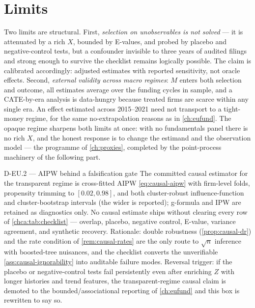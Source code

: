 \section{Limits}\label{chca:sec:limits}

Two limits are structural. First, \emph{selection on unobservables is not solved} --- it is
attenuated by a rich $X$, bounded by E-values, and probed by placebo and negative-control
tests, but a confounder invisible to three years of audited filings and strong enough to
survive the checklist remains logically possible. The claim is calibrated accordingly: adjusted
estimates with reported sensitivity, not oracle effects. Second, \emph{external validity across
macro regimes}: $M$ enters both selection and outcome, all estimates average over the funding
cycles in sample, and a CATE-by-era analysis is data-hungry because treated firms are scarce
within any single era. An effect estimated across 2015--2021 need not
transport to a tight-money regime, for the same no-extrapolation reasons as in \cref{ch:eufund}.
The opaque regime sharpens both limits at once: with no fundamentals panel there is no rich $X$,
and the honest response is to change the estimand and the observation model --- the programme of
\cref{ch:proxies}, completed by the point-process machinery of the following part.

\begin{decision}{D-EU.2 --- AIPW behind a falsification gate}
The committed causal estimator for the transparent regime is cross-fitted AIPW
\cref{eq:causal-aipw} with firm-level folds, propensity trimming to $[0.02, 0.98]$, and both
cluster-robust influence-function and cluster-bootstrap intervals (the wider is reported);
g-formula and IPW are retained as diagnostics only. No causal estimate ships without clearing
every row of \cref{chca:tab:checklist} --- overlap, placebo, negative control, E-value, variance
agreement, and synthetic recovery. Rationale: double robustness (\cref{prop:causal-dr}) and the
rate condition of \cref{rem:causal-rates} are the only route to $\sqrt{n}$ inference with
boosted-tree nuisances, and the checklist converts the unverifiable
\cref{ass:causal-ignorability} into auditable failure modes. Reversal trigger: if the placebo or
negative-control tests fail persistently even after enriching $Z$ with longer histories and
trend features, the transparent-regime causal claim is demoted to the bounded/associational
reporting of \cref{ch:eufund} and this box is rewritten to say so.
\end{decision}

